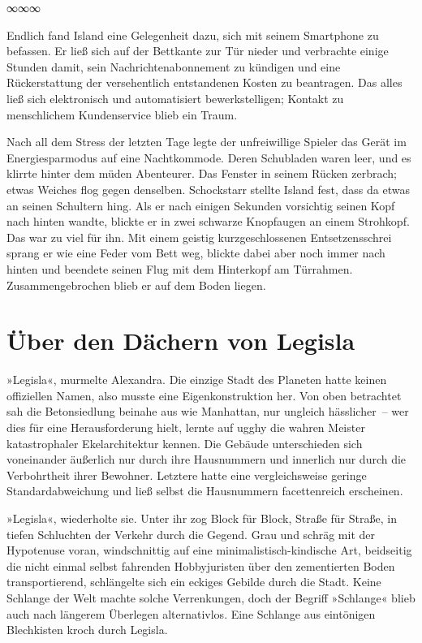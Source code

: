 \begin{center}
∞∞∞
\end{center}

Endlich fand Island eine Gelegenheit dazu, sich mit seinem Smartphone zu befassen. Er ließ sich auf der Bettkante zur Tür nieder und verbrachte einige Stunden damit, sein Nachrichtenabonnement zu kündigen und eine Rückerstattung der versehentlich entstandenen Kosten zu beantragen. Das alles ließ sich elektronisch und automatisiert bewerkstelligen; Kontakt zu menschlichem Kundenservice blieb ein Traum.

Nach all dem Stress der letzten Tage legte der unfreiwillige Spieler das Gerät im Energiesparmodus auf eine Nachtkommode. Deren Schubladen waren leer, und es klirrte hinter dem müden Abenteurer. Das Fenster in seinem Rücken zerbrach; etwas Weiches flog gegen denselben. Schockstarr stellte Island fest, dass da etwas an seinen Schultern hing. Als er nach einigen Sekunden vorsichtig seinen Kopf nach hinten wandte, blickte er in zwei schwarze Knopfaugen an einem Strohkopf. Das war zu viel für ihn. Mit einem geistig kurzgeschlossenen Entsetzensschrei sprang er wie eine Feder vom Bett weg, blickte dabei aber noch immer nach hinten und beendete seinen Flug mit dem Hinterkopf am Türrahmen. Zusammengebrochen blieb er auf dem Boden liegen.


\chapter{Über den Dächern von Legisla}

»Legisla«, murmelte Alexandra. Die einzige Stadt des Planeten hatte keinen offiziellen Namen, also musste eine Eigenkonstruktion her. Von oben betrachtet sah die Betonsiedlung beinahe aus wie Manhattan, nur ungleich hässlicher~– wer dies für eine Herausforderung hielt, lernte auf ugghy die wahren Meister katastrophaler Ekelarchitektur kennen. Die Gebäude unterschieden sich voneinander äußerlich nur durch ihre Hausnummern und innerlich nur durch die Verbohrtheit ihrer Bewohner. Letztere hatte eine vergleichsweise geringe Standardabweichung und ließ selbst die Hausnummern facettenreich erscheinen.

»Legisla«, wiederholte sie. Unter ihr zog Block für Block, Straße für Straße, in tiefen Schluchten der Verkehr durch die Gegend. Grau und schräg mit der Hypotenuse voran, windschnittig auf eine minimalistisch-kindische Art, beidseitig die nicht einmal selbst fahrenden Hobbyjuristen über den zementierten Boden transportierend, schlängelte sich ein eckiges Gebilde durch die Stadt. Keine Schlange der Welt machte solche Verrenkungen, doch der Begriff »Schlange« blieb auch nach längerem Überlegen alternativlos. Eine Schlange aus eintönigen Blechkisten kroch durch Legisla.

